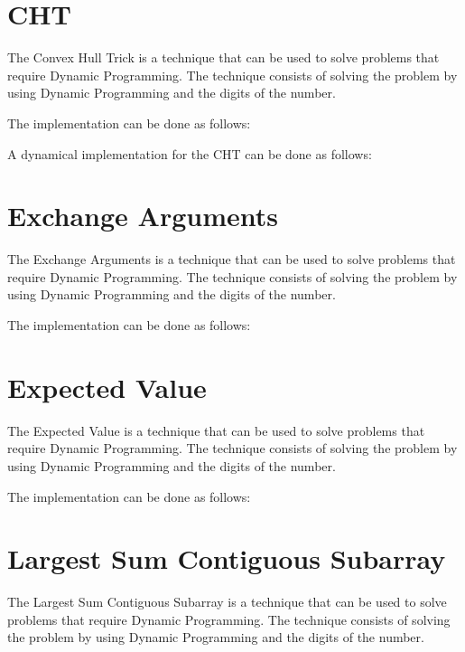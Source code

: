 

\section{CHT}

The Convex Hull Trick is a technique that can be used to solve problems that require Dynamic Programming. The technique consists of solving the problem by using Dynamic Programming and the digits of the number.

The implementation can be done as follows:



A dynamical implementation for the CHT can be done as follows:




\section{Exchange Arguments}

The Exchange Arguments is a technique that can be used to solve problems that require Dynamic Programming. The technique consists of solving the problem by using Dynamic Programming and the digits of the number.

The implementation can be done as follows:




\section{Expected Value}

The Expected Value is a technique that can be used to solve problems that require Dynamic Programming. The technique consists of solving the problem by using Dynamic Programming and the digits of the number.

The implementation can be done as follows:



\section{Largest Sum Contiguous Subarray}

The Largest Sum Contiguous Subarray is a technique that can be used to solve problems that require Dynamic Programming. The technique consists of solving the problem by using Dynamic Programming and the digits of the number.

